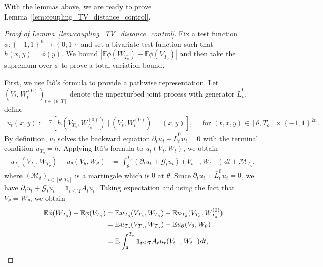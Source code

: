 \documentclass[11pt]{article}
\newcommand{\cM}{\mathcal{M}}
\newcommand{\stopT}{{\boldsymbol{\mathfrak{T}}}}
\newcommand{\uV}{V}
\newcommand{\uW}{W}
\newcommand{\cG}{\mathcal{G}}
\newcommand{\To}{{T_o}}
\newcommand{\jL}{\bar{L}}
\theoremstyle{named}
\theoremstyle{plain}
\newcommand{\defn}{:=}
\newcommand{\Exs}{\ensuremath{{\mathbb{E}}}}
\newcommand{\parenth}[1]{\left( #1 \right)}
\newcommand{\braces}[1]{\left\{ #1 \right \}}
\newcommand{\abss}[1]{\left| #1 \right |}
\begin{document}
With the lemmas above, we are ready to prove Lemma~\ref{lem:coupling_TV_distance_control}.
\begin{proof}[Proof of Lemma~\ref{lem:coupling_TV_distance_control}]
  Fix a test function $\phi:\braces{-1,1}^n \to \braces{0, 1}$ and set a bivariate test function such that $h(x, y) = \phi(y)$. We bound $\abss{\Exs \phi(\uW_{\To}) - \Exs \phi(\uV_{\To})}$ and then take the supremum over $\phi$ to prove a total-variation bound.

  First, we use It\^o's formula to provide a pathwise representation. Let $(\uV_t, \uW_{t}^{(0)})_{t \in [\theta, T]}$ denote the unperturbed joint process with generator $\jL_t^0$, define 
  \begin{align*}
    u_t(x, y) \defn \Exs[h(\uV_{\To}, \uW_{\To}^{(0)}) \mid (\uV_t, \uW_t^{(0)}) = (x, y)], \quad \text{ for } (t, x, y) \in [\theta, \To] \times \braces{-1,1}^{2n}.
  \end{align*}
  By definition, $u_t$ solves the backward equation $\partial_t u_t + \jL_t^0 u_t = 0$ with the terminal condition $u_{\To} = h$. Applying It\^o's formula to $u_t(\uV_t, \uW_t)$, we obtain
  \begin{align*}
    u_{\To}(\uV_{\To}, \uW_{\To}) - u_\theta(\uV_\theta, \uW_\theta) &= \int_\theta^{\To} \parenth{\partial_t u_t + \cG_t u_t}(\uV_{t-}, \uW_{t-}) dt + \cM_{\To},
  \end{align*}
  where $(\cM_{t})_{t \in [\theta, \To]}$ is a martingale which is $0$ at $\theta$.
  Since $\partial_t u_t + \jL_t^0 u_t = 0$, we have $\partial_t u_t + \cG_t u_t = \mathbf{1}_{t \leq \stopT} A_t u_t$. Taking expectation and using the fact that $\uV_\theta = \uW_\theta$, we obtain
  \begin{align}
    \label{eq:pathwise_formula}
    \Exs \phi(\uW_{\To}) - \Exs \phi(\uV_{\To})
    &= \Exs u_{\To}(\uV_{\To}, \uW_{\To}) - \Exs u_{\To}(\uV_{\To}, \uW_{\To}^{(0)}) \notag \\
    &= \Exs u_{\To}(\uV_{\To}, \uW_{\To}) - \Exs u_\theta(\uV_\theta, \uW_\theta) \notag \\
    &= \Exs \int_\theta^{\To} \mathbf{1}_{t \leq \stopT} A_t u_t(\uV_{t-}, \uW_{t-}) dt,
  \end{align}


\end{proof}
\end{document}
